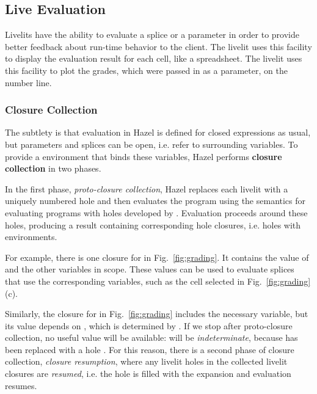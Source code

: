 \subsection{Live Evaluation}\label{sec:live-evaluation}
Livelits have the ability to evaluate a splice or a parameter
in order to provide better feedback about run-time behavior to the client.
The  livelit uses this facility to display
the evaluation result for each cell, like a spreadsheet.
The  livelit uses this facility to plot the grades, which were
passed in as a parameter, on the number line.

\subsubsection{Closure Collection}\label{sec:closure-collection-example} The subtlety is that 
evaluation in Hazel is defined for closed expressions as usual,
but parameters and splices can be open, i.e. refer to surrounding variables.
To provide a environment that binds these variables,
Hazel performs \textbf{closure collection} in two phases.

In the first phase, \emph{proto-closure collection},
Hazel replaces each livelit with a uniquely numbered hole and then evaluates the program
using the semantics for evaluating programs with holes developed by \citet{HazelnutLive}.
Evaluation proceeds around these holes, producing a result containing
corresponding hole closures, i.e. holes with environments.

For example, there is one closure for  in Fig.~\ref{fig:grading}.
It contains the value of  and the other variables in scope.
These values can be used to evaluate
splices that use the corresponding variables, such as the cell selected in Fig.~\ref{fig:grading}(c).

Similarly, the closure for  in Fig.~\ref{fig:grading} includes
the necessary  variable, but
its value depends on , which is determined by .
If we stop after proto-closure collection,
no useful value will be available:
 will be \emph{indeterminate}, because  has been replaced with a hole \cite{HazelnutLive}.
For this reason, there is a second phase of closure collection, \emph{closure resumption},
where any livelit holes
in the collected livelit closures are \emph{resumed}, i.e. the hole is filled with the expansion
 and evaluation resumes.

